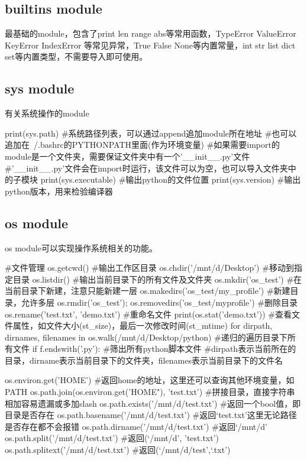   \subsection{builtins module}
    最基础的module，包含了print len range abs等常用函数，TypeError ValueError KeyError IndexError
    等常见异常，True False None等内置常量，int str list dict set等内置类型，不需要导入即可使用。

  \subsection{sys module}
    有关系统操作的module
    \begin{codeblock}[language=python, caption={sys module}]
      print(sys.path)
      #系统路径列表，可以通过append追加module所在地址
      #也可以追加在~/.bashrc的PYTHONPATH里面(作为环境变量)
      #如果需要import的module是一个文件夹，需要保证文件夹中有一个'\_\_init\_\_.py'文件
      #'\_\_init\_\_.py'文件会在import时运行，该文件可以为空，也可以导入文件夹中的子模块
      print(sys.executable) #输出python的文件位置
      print(sys.version) #输出python版本，用来检验编译器
    \end{codeblock}

  \subsection{os module}
    os module可以实现操作系统相关的功能。
    \begin{codeblock}[language=python, caption={os module}]
      #文件管理
      os.getcwd() #输出工作区目录
      os.chdir('/mnt/d/Desktop') #移动到指定目录
      os.listdir() #输出当前目录下的所有文件及文件夹
      os.mkdir('os_test') #在当前目录下新建，注意只能新建一层
      os.makedirs('os_test/my_profile') #新建目录，允许多层
      os.rmdir('os_test'); os.removedirs('os_test/myprofile') #删除目录
      os.rename('test.txt', 'demo.txt') #重命名文件
      print(os.stat('demo.txt')) #查看文件属性，如文件大小(st\_size)，最后一次修改时间(st\_mtime)
      for dirpath, dirnames, filenames in os.walk(/mnt/d/Desktop/python) #递归的遍历目录下所有文件
          if f.endswith('.py'): #筛出所有python脚本文件
      #dirpath表示当前所在的目录，dirname表示当前目录下的文件夹，filenames表示当前目录下的文件名

      os.environ.get('HOME') #返回home的地址，这里还可以查询其他环境变量，如PATH
      os.path.join(os.environ.get('HOME"), 'test.txt') #拼接目录，直接字符串相加容易遗漏或多加slash
      os.path.exists('/mnt/d/test.txt') #返回一个bool值，即目录是否存在
      os.path.basename('/mnt/d/test.txt') #返回`test.txt'这里无论路径是否存在都不会报错
      os.path.dirname('/mnt/d/test.txt') #返回`/mnt/d'
      os.path.split('/mnt/d/test.txt') #返回(`/mnt/d', 'test.txt')
      os.path.splitext('/mnt/d/test.txt') #返回(`/mnt/d/test',`.txt')
    \end{codeblock}

